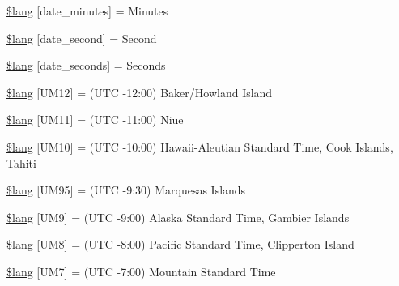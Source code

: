 \begin{DoxyCompactItemize}
\item 
\mbox{\hyperlink{date__lang_8php_a25b3a5d4d33a6edc34d328a7e834d453}{\$lang}} \mbox{[}\textquotesingle{}date\+\_\+minutes\textquotesingle{}\mbox{]} = \textquotesingle{}Minutes\textquotesingle{}
\item 
\mbox{\hyperlink{date__lang_8php_a8aae9b47730f6718515b9f08924741f8}{\$lang}} \mbox{[}\textquotesingle{}date\+\_\+second\textquotesingle{}\mbox{]} = \textquotesingle{}Second\textquotesingle{}
\item 
\mbox{\hyperlink{date__lang_8php_accf5b5584cd576f26304961c994f8118}{\$lang}} \mbox{[}\textquotesingle{}date\+\_\+seconds\textquotesingle{}\mbox{]} = \textquotesingle{}Seconds\textquotesingle{}
\item 
\mbox{\hyperlink{date__lang_8php_a25fe9da71ed486c8544c851f22942fde}{\$lang}} \mbox{[}\textquotesingle{}U\+M12\textquotesingle{}\mbox{]} = \textquotesingle{}(U\+TC -\/12\+:00) Baker/Howland Island\textquotesingle{}
\item 
\mbox{\hyperlink{date__lang_8php_abf94d9f775892861f954167aea9d7499}{\$lang}} \mbox{[}\textquotesingle{}U\+M11\textquotesingle{}\mbox{]} = \textquotesingle{}(U\+TC -\/11\+:00) Niue\textquotesingle{}
\item 
\mbox{\hyperlink{date__lang_8php_a575da8cd93146d40c5a929a7bf0144e7}{\$lang}} \mbox{[}\textquotesingle{}U\+M10\textquotesingle{}\mbox{]} = \textquotesingle{}(U\+TC -\/10\+:00) Hawaii-\/Aleutian Standard Time, Cook Islands, Tahiti\textquotesingle{}
\item 
\mbox{\hyperlink{date__lang_8php_a41f56156bb7619078e4f6f70364c99c2}{\$lang}} \mbox{[}\textquotesingle{}U\+M95\textquotesingle{}\mbox{]} = \textquotesingle{}(U\+TC -\/9\+:30) Marquesas Islands\textquotesingle{}
\item 
\mbox{\hyperlink{date__lang_8php_ae2fb16043175559d9ce90c2cbdcf0616}{\$lang}} \mbox{[}\textquotesingle{}U\+M9\textquotesingle{}\mbox{]} = \textquotesingle{}(U\+TC -\/9\+:00) Alaska Standard Time, Gambier Islands\textquotesingle{}
\item 
\mbox{\hyperlink{date__lang_8php_a259d60e179b8d8385f6f63a492b460dc}{\$lang}} \mbox{[}\textquotesingle{}U\+M8\textquotesingle{}\mbox{]} = \textquotesingle{}(U\+TC -\/8\+:00) Pacific Standard Time, Clipperton Island\textquotesingle{}
\item 
\mbox{\hyperlink{date__lang_8php_adc8b3c824a6ed1d151c5f7ebd9ba1f5e}{\$lang}} \mbox{[}\textquotesingle{}U\+M7\textquotesingle{}\mbox{]} = \textquotesingle{}(U\+TC -\/7\+:00) Mountain Standard Time\textquotesingle{}
\item 

\end{DoxyCompactItemize}

